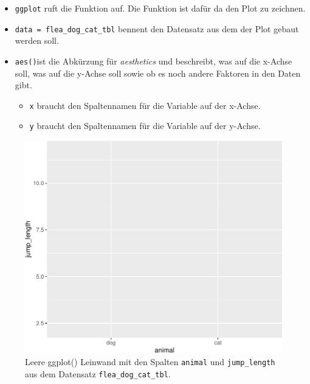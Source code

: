 \documentclass[
  letterpaper,
  DIV=11,
  oneside]{scrreport}
\providecommand{\tightlist}{%
  \setlength{\itemsep}{0pt}\setlength{\parskip}{0pt}}\usepackage{longtable,booktabs,array}
\begin{document}
\begin{itemize}
\tightlist
\item
  \texttt{ggplot} ruft die Funktion auf. Die Funktion ist dafür da den
  Plot zu zeichnen.
\item
  \texttt{data\ =\ flea\_dog\_cat\_tbl} bennent den Datensatz aus dem
  der Plot gebaut werden soll.
\item
  \texttt{aes()}ist die Abkürzung für \emph{aesthetics} und beschreibt,
  was auf die x-Achse soll, was auf die y-Achse soll sowie ob es noch
  andere Faktoren in den Daten gibt.

  \begin{itemize}
  \tightlist
  \item
    \texttt{x} braucht den Spaltennamen für die Variable auf der
    x-Achse.
  \item
    \texttt{y} braucht den Spaltennamen für die Variable auf der
    y-Achse.
  \end{itemize}
\end{itemize}

{}

\begin{figure}

{\centering \includegraphics{./eda-ggplot_files/figure-pdf/fig-ggplot-1-1.pdf}

}

\caption{\label{fig-ggplot-1}Leere ggplot() Leinwand mit den Spalten
\texttt{animal} und \texttt{jump\_length} aus dem Datensatz
\texttt{flea\_dog\_cat\_tbl}.}

\end{figure}
\end{document}
